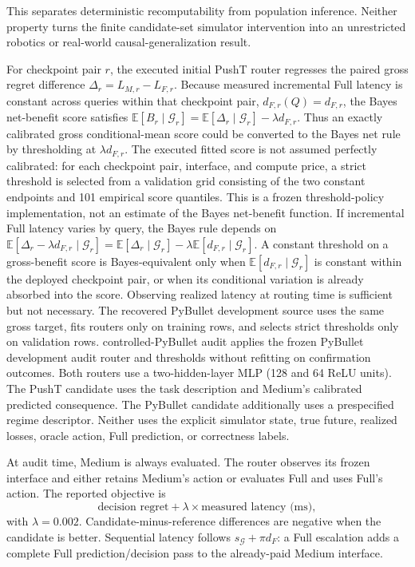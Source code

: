 \documentclass[10pt]{article}
\theoremstyle{definition}
\theoremstyle{remark}
\newcommand{\E}{\mathbb{E}}
\newcommand{\G}{\mathcal{G}}
\newcommand{\pusht}{PushT}
\newcommand{\pybullet}{PyBullet}
\begin{document}
This separates deterministic recomputability from population inference.
Neither property turns the finite candidate-set simulator intervention into an
unrestricted robotics or real-world causal-generalization result.

For checkpoint pair $r$, the executed initial PushT router regresses the paired gross
regret difference $\Delta_r=L_{M,r}-L_{F,r}$.  Because measured incremental
Full latency is constant across queries within that checkpoint pair,
$d_{F,r}(Q)=d_{F,r}$, the Bayes net-benefit score satisfies
$\E[B_r\mid\G_r]=\E[\Delta_r\mid\G_r]-\lambda d_{F,r}$.  Thus an exactly
calibrated gross conditional-mean score could be converted to the Bayes net
rule by thresholding at $\lambda d_{F,r}$.  The executed fitted score is not
assumed perfectly calibrated: for each checkpoint pair, interface, and compute
price, a strict threshold is selected from a validation grid consisting of
the two constant endpoints and 101 empirical score quantiles.  This is a
frozen threshold-policy implementation, not an estimate of the Bayes
net-benefit function.  If incremental Full latency varies by query, the Bayes rule depends on
$\E[\Delta_r-\lambda d_{F,r}\mid\G_r]
=\E[\Delta_r\mid\G_r]-\lambda\E[d_{F,r}\mid\G_r]$.
A constant threshold on a gross-benefit score is Bayes-equivalent only when
$\E[d_{F,r}\mid\G_r]$ is constant within the deployed checkpoint pair, or
when its conditional variation is already absorbed into the score.  Observing
realized latency at routing time is sufficient but not necessary.  The recovered PyBullet development source
uses the same gross target, fits routers only on training rows, and selects
strict thresholds only on validation rows.  controlled-PyBullet audit applies the frozen PyBullet development audit
router and thresholds without refitting on confirmation outcomes.  Both routers use a two-hidden-layer MLP (128 and 64 ReLU units).  The \pusht{} candidate uses the task
description and Medium's calibrated predicted consequence.  The \pybullet{}
candidate additionally uses a prespecified regime descriptor.  Neither uses
the explicit simulator state, true future, realized losses, oracle action,
Full prediction, or correctness labels.

At audit time, Medium is always evaluated.  The router observes its frozen
interface and either retains Medium's action or evaluates Full and uses Full's
action.  The reported objective is
\[
  \text{decision regret}+\lambda\times\text{measured latency (ms)},
\]
with $\lambda=0.002$.  Candidate-minus-reference differences are negative when
the candidate is better.  Sequential latency follows
$s_{\G}+\pi d_F$: a Full escalation adds a complete Full prediction/decision
pass to the already-paid Medium interface.
\end{document}

